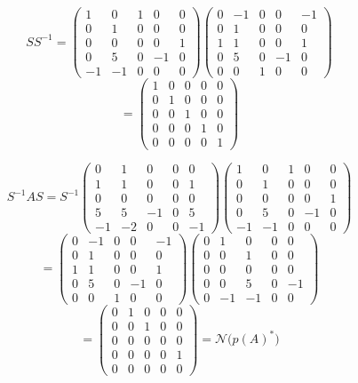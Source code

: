 \documentclass[a4paper,12pt]{article}
\begin{document}
\[
S S^{-1} =
\begin{pmatrix}
1 & 0 & 1 & 0 & 0 \\
0 & 1 & 0 & 0 & 0 \\
0 & 0 & 0 & 0 & 1 \\
0 & 5 & 0 & -1 & 0 \\
-1 & -1 & 0 & 0 & 0
\end{pmatrix}
\begin{pmatrix}
0 & -1 & 0 & 0 & -1 \\
0 & 1 & 0 & 0 & 0 \\
1 & 1 & 0 & 0 & 1 \\
0 & 5 & 0 & -1 & 0 \\
0 & 0 & 1 & 0 & 0
\end{pmatrix}
\]
\[
=
\begin{pmatrix}
1 & 0 & 0 & 0 & 0 \\
0 & 1 & 0 & 0 & 0 \\
0 & 0 & 1 & 0 & 0 \\
0 & 0 & 0 & 1 & 0 \\
0 & 0 & 0 & 0 & 1
\end{pmatrix}
\]

\[
S^{-1} A S = S^{-1}
\begin{pmatrix}
0 & 1 & 0 & 0 & 0 \\
1 & 1 & 0 & 0 & 1 \\
0 & 0 & 0 & 0 & 0 \\
5 & 5 & -1 & 0 & 5 \\
-1 & -2 & 0 & 0 & -1
\end{pmatrix}
\begin{pmatrix}
1 & 0 & 1 & 0 & 0 \\
0 & 1 & 0 & 0 & 0 \\
0 & 0 & 0 & 0 & 1 \\
0 & 5 & 0 & -1 & 0 \\
-1 & -1 & 0 & 0 & 0
\end{pmatrix}
\]
\[
=
\begin{pmatrix}
0 & -1 & 0 & 0 & -1 \\
0 & 1 & 0 & 0 & 0 \\
1 & 1 & 0 & 0 & 1 \\
0 & 5 & 0 & -1 & 0 \\
0 & 0 & 1 & 0 & 0
\end{pmatrix}
\begin{pmatrix}
0 & 1 & 0 & 0 & 0 \\
0 & 0 & 1 & 0 & 0 \\
0 & 0 & 0 & 0 & 0 \\
0 & 0 & 5 & 0 & -1 \\
0 & -1 & -1 & 0 & 0
\end{pmatrix}
\]
\[
=
\begin{pmatrix}
0 & 1 & 0 & 0 & 0 \\
0 & 0 & 1 & 0 & 0 \\
0 & 0 & 0 & 0 & 0 \\
0 & 0 & 0 & 0 & 1 \\
0 & 0 & 0 & 0 & 0
\end{pmatrix}
= \mathcal{N}\bigl(p(A)^*\bigr)
\]
\end{document}

